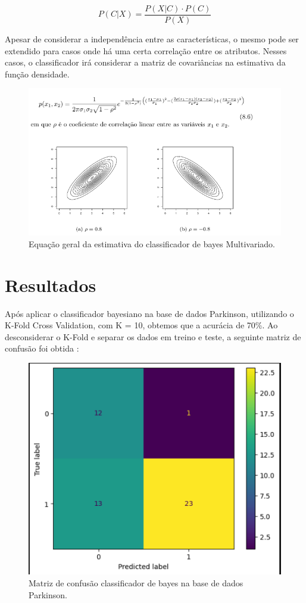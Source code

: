 \documentclass{article}
\begin{document}
 \[
P(C|X) = \frac{P(X|C) \cdot P(C)}{P(X)}
\]

Apesar de considerar a independência entre as características, o mesmo pode ser extendido para casos onde há uma certa correlação entre os atributos. Nesses casos, o classificador irá considerar a matriz de covariâncias na estimativa da função densidade.

\begin{figure}[h]
    \centering
    \includegraphics[width=0.75\linewidth]{caso_geral_bayes.png}
    \caption{Equação geral da estimativa do classificador de bayes Multivariado.}
    \label{fig:kernel_types}
 \end{figure}

\section{Resultados}

Após aplicar o classificador bayesiano na base de dados Parkinson, utilizando o K-Fold Cross Validation, com K = 10, obtemos que a acurácia de 70\%. Ao desconsiderar o K-Fold e separar os dados em treino e teste, a seguinte matriz de confusão foi obtida : 

\begin{figure}[h]
    \centering
    \includegraphics[width=0.75\linewidth]{conf_mat.png}
    \caption{Matriz de confusão classificador de bayes na base de dados Parkinson.}
    \label{fig:kernel_types}
 \end{figure}
\end{document}
